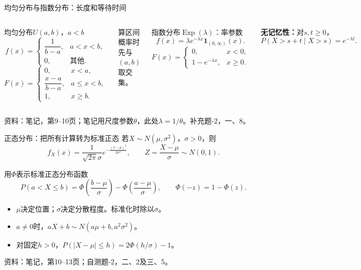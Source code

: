 \documentclass[aspectratio=169,10pt]{beamer}
\newcommand{\ind}{\mathbf{1}}
\DeclareMathOperator{\Exp}{Exp}
\newcommand{\source}[1]{\vfill{\color{Muted}\fontsize{6.5}{8}\selectfont 资料：#1\par}}
\begin{document}
\begin{frame}[t]{均匀分布与指数分布：长度和等待时间}
\begin{columns}[T]
\begin{block}{均匀分布$U(a,b)$，$a<b$}
\[
f(x)=\begin{cases}\dfrac1{b-a},&a<x<b,\\0,&\text{其他}.\end{cases}
\]
\[
F(x)=\begin{cases}0,&x<a,\\\dfrac{x-a}{b-a},&a\le x<b,\\1,&x\ge b.\end{cases}
\]
\end{block}
算区间概率时先与$(a,b)$取交集。
\begin{block}{指数分布$\Exp(\lambda)$：率参数}
\[
f(x)=\lambda e^{-\lambda x}\ind_{(0,\infty)}(x).
\]
\[
F(x)=\begin{cases}0,&x<0,\\1-e^{-\lambda x},&x\ge0.\end{cases}
\]
\end{block}
\textbf{无记忆性：}对$s,t\ge0$，
\[
P(X>s+t\mid X>s)=e^{-\lambda t}.
\]
\end{columns}
\source{笔记，第9--10页；笔记用尺度参数$\theta$，此处$\lambda=1/\theta$。补充题-2，一、8。}
\end{frame}

\begin{frame}[t]{正态分布：把所有计算转为标准正态}
若$X\sim N(\mu,\sigma^2)$，$\sigma>0$，则
\[
f_X(x)=\frac1{\sqrt{2\pi}\sigma}e^{-\frac{(x-\mu)^2}{2\sigma^2}},
\qquad Z=\frac{X-\mu}{\sigma}\sim N(0,1).
\]
\begin{block}{用$\Phi$表示标准正态分布函数}
\[
P(a<X\le b)=\Phi\!\left(\frac{b-\mu}{\sigma}\right)
-\Phi\!\left(\frac{a-\mu}{\sigma}\right),\qquad \Phi(-z)=1-\Phi(z).
\]
\end{block}
\begin{itemize}
\item $\mu$决定位置；$\sigma$决定分散程度。标准化时除以$\sigma$。
\item $a\ne0$时，$aX+b\sim N(a\mu+b,a^2\sigma^2)$。
\item 对固定$h>0$，$P(|X-\mu|\le h)=2\Phi(h/\sigma)-1$。
\end{itemize}
\source{笔记，第10--13页；自测题-2，二、2及三、5。}
\end{frame}
\end{document}
